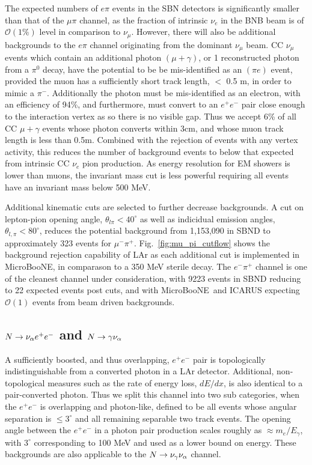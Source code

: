 \documentclass[11pt, a4paper]{article}
\newcommand{\reffig}[1]{Fig.~\ref{#1}}
\def\muboone{MicroBooNE}
\def\ster{\ensuremath N}
\begin{document}
The expected numbers of $e \pi$ events in the SBN detectors is significantly
smaller than that of the $\mu \pi$ channel, as the fraction of intrinsic
$\nu_e$ in the BNB beam is of $\mathcal{O}(1\%)$ level in comparison to
$\nu_\mu$. However, there will also be additional backgrounds to the $e \pi$
channel originating from the dominant $\nu_\mu$ beam. CC $\nu_\mu$ events which
contain an additional photon $(\mu+\gamma)$, or 1 reconstructed photon from a
$\pi^0$ decay, have the potential to be be mis-identified as an $(\pi e)$
event, provided the muon has a sufficiently short track length, $<$ 0.5 m, in
order to mimic a $\pi^-$. Additionally the photon must be mis-identified as an
electron, with an efficiency of 94\%, and furthermore, must convert to an
$e^+e^-$ pair close enough to the interaction vertex as so there is no visible
gap. Thus we accept 6\% of all CC $\mu+\gamma$ events whose photon converts
within 3cm, and whose muon track length is less than 0.5m. Combined with the
rejection of events with any vertex activity, this reduces the number of
background events to below that expected from intrinsic CC $\nu_e$ pion
production. As energy resolution for EM showers is lower than muons, the
invariant mass cut is less powerful requiring all events have an invariant mass
below 500 MeV. 

Additional kinematic cuts are selected to further decrease backgrounds. A cut
on lepton-pion opening angle, $\theta_{l \pi} < 40^\circ$ as well as indicidual
emission angles, $\theta_{l,\pi} < 80^\circ$, reduces the potential background
from 1,153,090 in SBND to approximately 323 events for $\mu^- \pi^+$.
\reffig{fig:mu_pi_cutflow} shows the background rejection capability of LAr as
each additional cut is implemented in \muboone, in comparason to a 350 MeV
sterile decay. The $e^- \pi^+$ channel is one of the cleanest channel under
consideration, with 9223 events in SBND reducing to 22 expected events post
cuts, and with \muboone\ and ICARUS expecting $\mathcal{O}(1)$ events from
beam driven backgrounds.


\subsection{$\ster \rightarrow \nu_\alpha e^+ e^-$ and $\ster \rightarrow \gamma \nu_\alpha$ }

A sufficiently boosted, and thus overlapping, $e^+e^-$ pair is topologically
indistinguishable from a converted photon in a LAr detector. Additional,
non-topological measures such as the rate of energy loss, $dE/dx$, is also
identical to a pair-converted photon. Thus we split this channel into two sub
categories, when the $e^+e^-$ is overlapping and photon-like, defined to be all
events whose angular separation is $\leq 3^\circ$\cite{Spitz:2011wba} and all
remaining separable two track events. The opening angle between the $e^+e^-$ in
a photon pair production scales roughly as $\approx m_e/E_\gamma$, with
$3^\circ$ corresponding to 100 MeV and used as a lower bound on energy. These
backgrounds are also applicable to the $\ster \rightarrow \nu_\gamma
\nu_\alpha$ channel.\\ 
\end{document}
